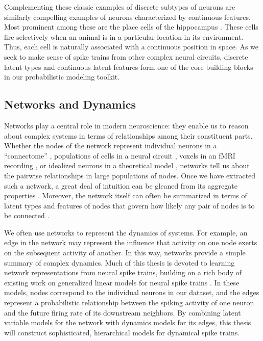Complementing these classic examples of discrete subtypes of neurons 
are similarly compelling examples of neurons characterized by 
continuous features. Most prominent among these are the place cells 
of the hippocampus \citep{OKeefe78}. These cells fire selectively 
when an animal is in a particular location in its environment. Thus,
each cell is naturally associated with a continuous position in 
space. As we seek to make sense of spike trains from other complex neural circuits, 
discrete latent types and continuous latent features form one of the
core building blocks in our probabilistic modeling toolkit. 


\subsection{Networks and Dynamics}
Networks play a central role in modern neuroscience: they enable us to
reason about complex systems in terms of relationships among their
constituent parts. Whether the nodes of the network represent
individual neurons in a ``connectome''
\citep[e.g.][]{sporns2005human}, populations of cells in a neural
circuit \citep[e.g.][]{felleman1991distributed}, voxels in an fMRI
recording \citep[e.g.][]{friston1994functional}, or idealized neurons
in a theoretical model \citep[e.g.][]{hopfield1982neural}, networks
tell us about the pairwise relationships in large populations of
nodes.  Once we have extracted such a network, a great deal of
intuition can be gleaned from its aggregate properties
\citep{bullmore2009complex, newman2003structure}.  Moreover, the
network itself can often be summarized in terms of latent types and
features of nodes that govern how likely any pair of nodes is to be
connected \citep{Goldenberg-2010}.

We often use networks to represent the dynamics of systems.  For
example, an edge in the network may represent the influence that
activity on one node exerts on the subsequent activity of another. In
this way, networks provide a simple summary of complex dynamics. Much
of this thesis is devoted to learning network representations from
neural spike trains, building on a rich body of existing work on
generalized linear models for neural spike trains
\citep{Paninski-2004, Truccolo-2005, Pillow-2008}.  In these models,
nodes correspond to the individual neurons in our dataset, and the
edges represent a probabilistic relationship between the spiking
activity of one neuron and the future firing rate of its downstream
neighbors.  By combining latent variable models for the network with
dynamics models for its edges, this thesis will construct
sophisticated, hierarchical models for dynamical spike trains.


